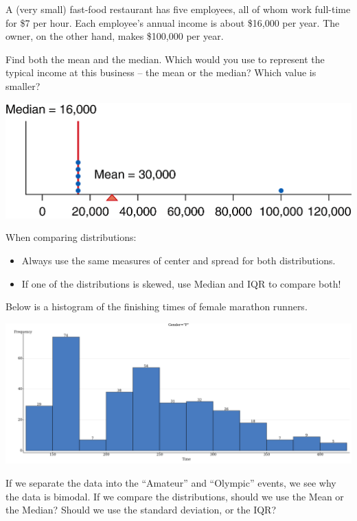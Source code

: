 \documentclass[../mathNotesPreamble]{subfiles}
\begin{document}
    \begin{ex*}
      A (very small) fast-food restaurant has five employees, all of whom work full-time for \$7 per hour. Each employee’s annual income is about \$16,000 per year. The owner, on the other hand, makes \$100,000 per year.

Find both the mean and the median. Which would you use to represent the typical income at this business -- the mean or the median?  Which value is smaller?
    \end{ex*}
    \vspace*{\baselineskip}

    \begin{center}
      \includegraphics[width=0.75\linewidth]{images/math211_figure_3p26}
    \end{center}

    \noindent
    When comparing distributions:
    \begin{itemize}
      \item Always use the same measures of center and spread for both distributions.
      \item If one of the distributions is skewed, use Median and IQR to compare both!
    \end{itemize}
    \pagebreak

    \begin{ex*}
      Below is a histogram of the finishing times of female marathon runners.
    \end{ex*}
    \begin{center}
      \includegraphics[width=0.65\linewidth]{images/math211_3p4_female_marathon_times}
    \end{center}
    If we separate the data into the ``Amateur'' and ``Olympic'' events, we see why the data is bimodal. If we compare the distributions, should we use the Mean or the Median? Should we use the standard deviation, or the IQR?
\end{document}
